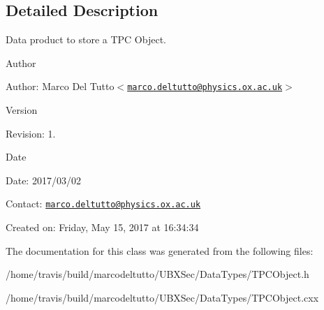 \subsection{\-Detailed \-Description}
\-Data product to store a \-T\-P\-C \-Object. 

\begin{DoxyAuthor}{\-Author}

\end{DoxyAuthor}
\begin{DoxyParagraph}{\-Author\-:}
\-Marco \-Del \-Tutto$<$\href{mailto:marco.deltutto@physics.ox.ac.uk}{\tt marco.\-deltutto@physics.\-ox.\-ac.\-uk}$>$ 
\end{DoxyParagraph}


\begin{DoxyVersion}{\-Version}

\end{DoxyVersion}
\begin{DoxyParagraph}{\-Revision\-:}
1. 
\end{DoxyParagraph}


\begin{DoxyDate}{\-Date}

\end{DoxyDate}
\begin{DoxyParagraph}{\-Date\-:}
2017/03/02 
\end{DoxyParagraph}


\-Contact\-: \href{mailto:marco.deltutto@physics.ox.ac.uk}{\tt marco.\-deltutto@physics.\-ox.\-ac.\-uk}

\-Created on\-: \-Friday, \-May 15, 2017 at 16\-:34\-:34 

\-The documentation for this class was generated from the following files\-:\begin{DoxyCompactItemize}
\item 
/home/travis/build/marcodeltutto/\-U\-B\-X\-Sec/\-Data\-Types/\-T\-P\-C\-Object.\-h\item 
/home/travis/build/marcodeltutto/\-U\-B\-X\-Sec/\-Data\-Types/\-T\-P\-C\-Object.\-cxx\end{DoxyCompactItemize}
